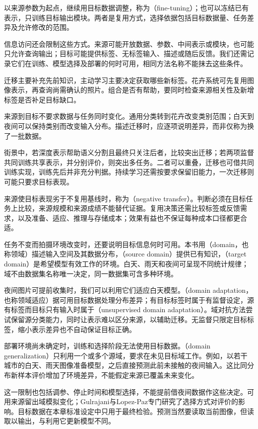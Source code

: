 以来源参数为起点，继续用目标数据调整，称为（fine-tuning）；也可以冻结已有表示，只训练目标输出模块。两者是复用方式，选择依据包括目标数据量、任务差异及允许修改的范围。

信息访问还会限制这些方式。来源可能开放数据、参数、中间表示或模块，也可能只允许查询输出；目标可能提供标签、无标签输入、描述或随后反馈。我们还需记录它们在训练、模型选择及部署的何时可用，相同方法名称不能抹去这些条件。

迁移主要补充先前知识，主动学习主要决定获取哪些新标签。花卉系统可先复用图像表示，再查询尚需确认的照片。组合是否有帮助，要同时检查来源相关性及新增标签是否补足目标缺口。

来源到目标不要求数据与任务同时变化。通用分类转到花卉改变类别范围；白天到夜间可以保持类别而改变输入分布。描述迁移时，应逐项说明差异，而非仅称为换了一批数据。

街景中，若深度表示帮助语义分割且最终只关注后者，比较突出迁移；若两项监督共同训练共享表示，并分别评价，则突出多任务。二者可以重叠，迁移也可借共同训练实现，训练先后并非充分判据。持续学习还需按要求保留旧能力，一次迁移则可能只要求目标表现。

来源使目标表现劣于不复用基线时，称为（negative transfer）。判断必须在目标任务上比较，来源规模和来源成绩不能替代证据。复用决策还需比较标签或反馈需求，以及准备、适应、推理与存储成本；效果有益也不保证每种成本口径都更合适。

任务不变而拍摄环境改变时，还要说明目标信息何时可用。本书用（domain，也称领域）描述输入空间及其数据分布，（source domain）提供已有知识，（target domain）是希望模型有效工作的环境。白天、雨天和夜间可呈现不同统计规律；域不由数据集名称唯一决定，同一数据集可含多种环境。

夜间图片可提前收集时，我们可以利用它们适应白天模型。（domain adaptation，也称领域适应）据可用目标数据处理分布差异；有目标标签时属于有监督设定，源有标签而目标只有输入时属于（unsupervised domain adaptation）。域对抗方法尝试保留源分类能力，同时让表示难以区分来源，以辅助迁移。无监督只限定目标标签，缩小表示差异也不自动保证目标正确。

部署环境尚未确定时，训练和选择阶段无法使用目标数据。（domain generalization）只利用一个或多个源域，要求在未见目标域工作。例如，以若干城市的白天、雨天图像准备模型，之后直接预测此前未接触的夜间输入。这比同分布新样本评价增加了环境差异，不能假定来源已覆盖未来变化。

这一限制也包括调参、停止时间和模型选择，不能提前借夜间数据作这些决定。可用来源留出域模拟变化；Gulrajani与Lopez-Paz专门研究了选择方式对评价的影响。目标数据在本章标准设定中只用于最终检验。预测当然要读取当前图像，但读取以输出，与利用它更新模型不同。


